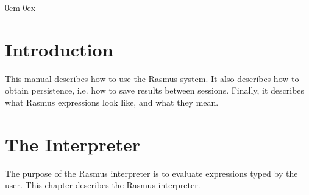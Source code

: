\documentclass[a4,14pt,latin1]{article}
\begin{document}
\begin{latexonly}
\parindent 0em
\parskip \baselineskip %
\itemsep 0ex
\end{latexonly}
\newcommand{\sectionref}[1]{section~\ref{#1}}
\newcommand{\chapterref}[1]{chapter~\ref{#1}}
\newcommand{\Chapterref}[1]{Chapter~\ref{#1}}
\newcommand{\figureref}[1]{figure~\ref{#1}}
\newcommand{\RASMUS}{{\sc Xrasmus}}
\newcommand{\UCRASMUS}{{\tt xrasmus}}
\newcommand{\MODIFY}{{\sc Xmodify}}
\newcommand{\X}{{\sc X}}
\newcommand{\UNIX}{{\sc UNIX}}
\newcommand{\FIX}[1]{$\langle\langle$#1$\rangle\rangle$}
\newcommand{\SET}[1]{\{#1\}}
\newcommand{\NT}[1]{$\langle$#1$\rangle$}
\newcommand{\BUTTON}[1]{\fbox{\tt #1}}
\newcommand{\FBUTTON}[1]{\framebox[2em]{\rule[-.5ex]{0em}{2.5ex}{\tt #1}}}
\newcommand{\META}[1]{{\rm\bf #1}\index{syntaks!#1}}
\newcommand{\METAPLUS}[1]{{\rm\bf #1}$^{\displaystyle +}$\index{syntaks!#1}}
\newcommand{\METASTAR}[1]{{\rm\bf #1}$^{\displaystyle \,*}$\index{syntaks!#1}}
\newcommand{\METAPLUSLIST}[1]{{\rm\bf #1}$^{\displaystyle
                                            \,+\lambda}$\index{syntaks!#1}}
\newcommand{\METASTARLIST}[1]{{\rm\bf #1}$^{\displaystyle
                                            \,*\lambda}$\index{syntaks!#1}}
\newcommand{\METAOPT}[1]{{\rm\bf #1}$^{\displaystyle
                                            \,\circ}$\index{syntaks!#1}}
\newcommand{\IS}{$::=\;\;\;$}
\newcommand{\OR}{$\;\;\mid\;\;$}
%
\newcommand{\define}[1]{{\it #1\/}}
\newcommand{\RAS}{{\sc Rasmus}}
\newcommand{\EMACS}{{\sc Emacs}}
\newcommand{\menu}[1]{\fbox{\fbox{\tt #1}}}
\newcommand{\mopt}[1]{\fbox{\tt #1}}
%
\begin{latexonly}
  \tableofcontents
  \newpage
\end{latexonly}
%
\section{Introduction}

This manual describes how to use the Rasmus system. It also describes
how to obtain persistence, i.e. how to save results between
sessions. Finally, it describes what Rasmus expressions look like, and
what they mean.

\section{The Interpreter}

The purpose of the Rasmus interpreter is to evaluate expressions typed
by the user. This chapter describes the \RAS{} interpreter.
\end{document}
